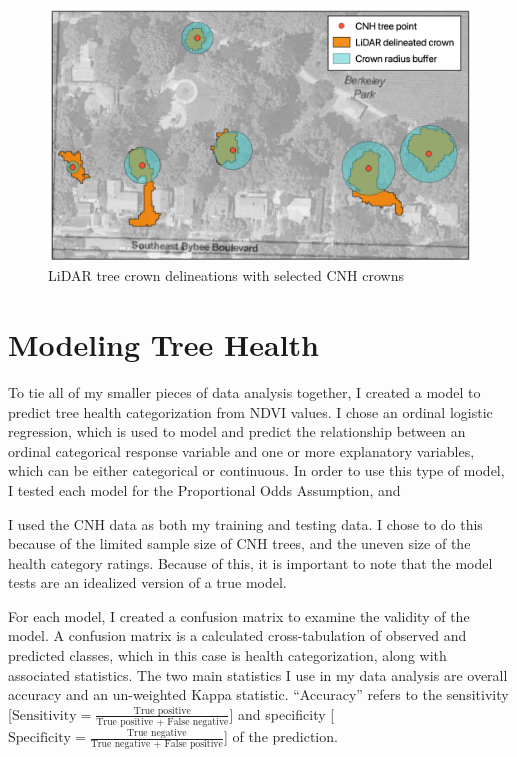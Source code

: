 \documentclass[12pt,twoside]{reedthesis}
\begin{document}
\begin{figure}

{\centering \includegraphics[width=0.8\linewidth]{figure/layered_outputs} 

}

\caption{LiDAR tree crown delineations with selected CNH crowns}\label{fig:unnamed-chunk-7}
\end{figure}
\hypertarget{modeling-tree-health}{%
\section{Modeling Tree Health}\label{modeling-tree-health}}

To tie all of my smaller pieces of data analysis together, I created a model to predict tree health categorization from NDVI values. I chose an ordinal logistic regression, which is used to model and predict the relationship between an ordinal categorical response variable and one or more explanatory variables, which can be either categorical or continuous. In order to use this type of model, I tested each model for the Proportional Odds Assumption, and

I used the CNH data as both my training and testing data. I chose to do this because of the limited sample size of CNH trees, and the uneven size of the health category ratings. Because of this, it is important to note that the model tests are an idealized version of a true model.

For each model, I created a confusion matrix to examine the validity of the model. A confusion matrix is a calculated cross-tabulation of observed and predicted classes, which in this case is health categorization, along with associated statistics. The two main statistics I use in my data analysis are overall accuracy and an un-weighted Kappa statistic. ``Accuracy'' refers to the sensitivity {[}\(\textrm{Sensitivity}= \frac{\textrm{True positive}}{\textrm{True positive + False negative}}\){]} and specificity {[}\(\textrm{Specificity}= \frac{\textrm{True negative}}{\textrm{True negative + False positive}}\){]} of the prediction.
\end{document}
